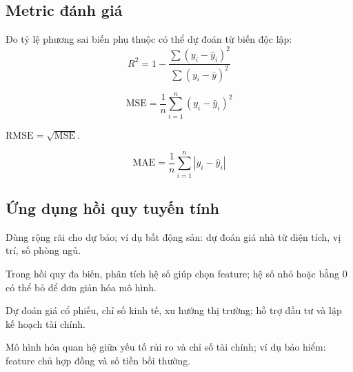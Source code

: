 \subsection{Metric đánh giá}

\begin{tinhchat}[title={$R^2$ (R-squared)}]
Đo tỷ lệ phương sai biến phụ thuộc có thể dự đoán từ biến độc lập:
\[
R^2 = 1 - \frac{\sum (y_i - \hat{y}_i)^2}{\sum (y_i - \bar{y})^2}
\]
\end{tinhchat}

\begin{tinhchat}[title={MSE}]
\[
\mathrm{MSE} = \frac{1}{n} \sum_{i=1}^n (y_i - \hat{y}_i)^2
\]
\end{tinhchat}

\begin{tinhchat}[title={RMSE}]
$\mathrm{RMSE} = \sqrt{\mathrm{MSE}}$.
\end{tinhchat}

\begin{tinhchat}[title={MAE}]
\[
\mathrm{MAE} = \frac{1}{n} \sum_{i=1}^n |y_i - \hat{y}_i|
\]
\end{tinhchat}

\subsection{Ứng dụng hồi quy tuyến tính}

\begin{ynghia}[title={Mô hình dự báo (Predictive Modeling)}]
Dùng rộng rãi cho dự báo; ví dụ bất động sản: dự đoán giá nhà từ diện tích, vị trí, số phòng ngủ.
\end{ynghia}

\begin{ynghia}[title={Chọn feature (Feature Selection)}]
Trong hồi quy đa biến, phân tích hệ số giúp chọn feature; hệ số nhỏ hoặc bằng 0 có thể bỏ để đơn giản hóa mô hình.
\end{ynghia}

\begin{ynghia}[title={Dự báo tài chính (Financial Forecasting)}]
Dự đoán giá cổ phiếu, chỉ số kinh tế, xu hướng thị trường; hỗ trợ đầu tư và lập kế hoạch tài chính.
\end{ynghia}

\begin{ynghia}[title={Quản trị rủi ro (Risk Management)}]
Mô hình hóa quan hệ giữa yếu tố rủi ro và chỉ số tài chính; ví dụ bảo hiểm: feature chủ hợp đồng và số tiền bồi thường.
\end{ynghia}

